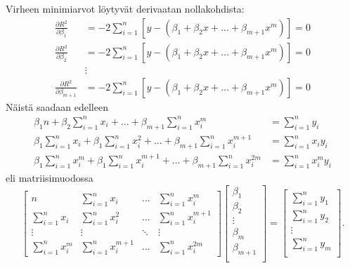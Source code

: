\documentclass[12pt,a4paper,titlepage]{article}
\begin{document}
Virheen minimiarvot löytyvät derivaatan nollakohdista:~\cite{wolframmath}
\begin{align*}
	\frac{\partial R^2}{\partial \beta_1} &= -2\sum\limits_{i=1}^n[y-(\beta_1+\beta_2x+...+\beta_{m+1}x^m)]=0 \\
	\frac{\partial R^2}{\partial \beta_2} &= -2\sum\limits_{i=1}^n[y-(\beta_1+\beta_2x+...+\beta_{m+1}x^m)]=0 \\
	&\vdots  \\
	\frac{\partial R^2}{\partial \beta_{m+1}} &= -2\sum\limits_{i=1}^n[y-(\beta_1+\beta_2x+...+\beta_{m+1}x^m)]=0
\end{align*}
Näistä saadaan edelleen 
\begin{align*}
	\beta_1 n+\beta_2\sum\limits_{i=1}^n x_i+...+\beta_{m+1} \sum\limits_{i=1}^n x_i^m &= \sum\limits_{i=1}^n y_i \\
	\beta_1\sum\limits_{i=1}^nx_i+\beta_1\sum\limits_{i=1}^nx_i^2+...+\beta_{m+1}\sum\limits_{i=1}^nx_i^{m+1} &= \sum\limits_{i=1}^n x_iy_i  \\
	\beta_1\sum\limits_{i=1}^nx_i^{m}+\beta_1\sum\limits_{i=1}^nx_i^{m+1}+...+\beta_{m+1}\sum\limits_{i=1}^nx_i^{2m} &= \sum\limits_{i=1}^n x_i^{m}y_i
\end{align*}
eli matriisimuodossa
\begin{equation} \label{matriisimuoto}
	\begin{bmatrix}
		n & \sum\limits_{i=1}^{n} x_i & ... & \sum\limits_{i=1}^{n} x_i^{m} \\
		\sum\limits_{i=1}^{n} x_i & \sum\limits_{i=1}^{n} x_i^2 & ... & \sum\limits_{i=1}^{n} x_i^{m+1} \\
		\vdots & \vdots & \ddots  & \vdots \\
		\sum\limits_{i=1}^{n} x_i^{m} & \sum\limits_{i=1}^{n} x_i^{m+1} & ... & \sum\limits_{i=1}^{n} x_i^{2m}
	\end{bmatrix}
	\begin{bmatrix}
		\beta_1 \\
		\beta_2 \\
		\vdots \\
		\beta_{m} \\
		\beta_{m+1} \\
	\end{bmatrix}
	=
	\begin{bmatrix}
		\sum\limits_{i=1}^n y_1 \\
		\sum\limits_{i=1}^n y_2 \\
		\vdots \\
		\sum\limits_{i=1}^n y_{m} \\
	\end{bmatrix}.
\end{equation}
\end{document}
